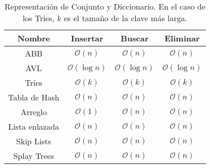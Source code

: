 \documentclass{article}
\newcommand{\BigO}[1]{{\mathcal{O}(#1)}}
\begin{document}
\begin{table}[H]
    \centering
    \begin{tabular}{|c|c|c|c|}\hline
        Nombre         & Insertar         & Buscar           & Eliminar         \\
        \hline
        ABB            & $\BigO{n}$       & $\BigO{n}$       & $\BigO{n}$       \\
        \hline
        AVL            & $\BigO{\log{n}}$ & $\BigO{\log{n}}$ & $\BigO{\log{n}}$ \\
        \hline
        Tries          & $\BigO{k}$       & $\BigO{k}$       & $\BigO{k}$       \\
        \hline
        Tabla de Hash  & $\BigO{n}$       & $\BigO{n}$       & $\BigO{n}$       \\
        \hline
        Arreglo        & $\BigO{1}$       & $\BigO{n}$       & $\BigO{n}$       \\
        \hline
        Lista enlazada & $\BigO{n}$       & $\BigO{n}$       & $\BigO{n}$       \\
        \hline
        Skip Lists     & $\BigO{n}$       & $\BigO{n}$       & $\BigO{n}$       \\
        \hline
        Splay Trees    & $\BigO{n}$       & $\BigO{n}$       & $\BigO{n}$       \\
        \hline
    \end{tabular}
    \caption*{Representación de Conjunto y Diccionario. En el caso de los Tries, $k$ es el tamaño de la clave más larga.}
    \label{table-dict-complexities}
\end{table}
\end{document}
